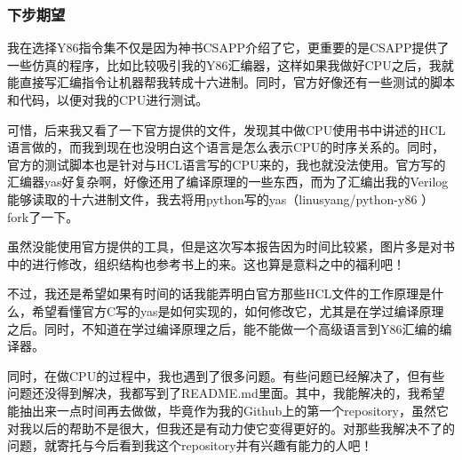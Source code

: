 \documentclass[12pt]{article}
\begin{document}
\begin{CJK*}{GB}{gbsn}
\subsubsection{下步期望}\label{ux4e0bux6b65ux671fux671b}

我在选择Y86指令集不仅是因为神书CSAPP介绍了它，更重要的是CSAPP提供了一些仿真的程序，比如比较吸引我的Y86汇编器，这样如果我做好CPU之后，我就能直接写汇编指令让机器帮我转成十六进制。同时，官方好像还有一些测试的脚本和代码，以便对我的CPU进行测试。

可惜，后来我又看了一下官方提供的文件，发现其中做CPU使用书中讲述的HCL语言做的，而我到现在也没明白这个语言是怎么表示CPU的时序关系的。同时，官方的测试脚本也是针对与HCL语言写的CPU来的，我也就没法使用。官方写的汇编器yas好复杂啊，好像还用了编译原理的一些东西，而为了汇编出我的Verilog能够读取的十六进制文件，我去将用python写的yas（linusyang/python-y86
）fork了一下。

虽然没能使用官方提供的工具，但是这次写本报告因为时间比较紧，图片多是对书中的进行修改，组织结构也参考书上的来。这也算是意料之中的福利吧！

不过，我还是希望如果有时间的话我能弄明白官方那些HCL文件的工作原理是什么，希望看懂官方C写的yas是如何实现的，如何修改它，尤其是在学过编译原理之后。同时，不知道在学过编译原理之后，能不能做一个高级语言到Y86汇编的编译器。

同时，在做CPU的过程中，我也遇到了很多问题。有些问题已经解决了，但有些问题还没得到解决，我都写到了README.md里面。其中，我能解决的，我希望能抽出来一点时间再去做做，毕竟作为我的Github上的第一个repository，虽然它对我以后的帮助不是很大，但我还是有动力使它变得更好的。对那些我解决不了的问题，就寄托与今后看到我这个repository并有兴趣有能力的人吧！

\end{CJK*}
\end{document}
